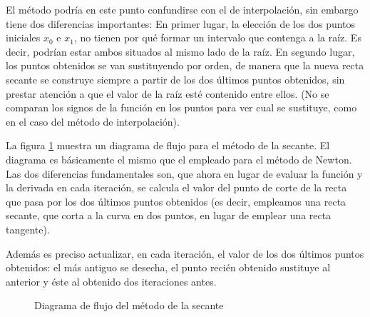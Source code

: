 El método podría en este punto confundirse con el de interpolación, sin embargo tiene dos diferencias importantes: En primer lugar, la elección de los dos puntos iniciales $x_0$ e $x_1$, no tienen por qué formar un intervalo que contenga a la raíz. Es decir, podrían estar ambos situados al mismo lado de la raíz. En segundo lugar, los puntos obtenidos se van sustituyendo por orden, de manera que la nueva recta secante se construye siempre a partir de los dos últimos puntos obtenidos, sin prestar atención a que el valor de la raíz esté contenido entre ellos. (No se comparan los signos de la función en los puntos para ver cual se sustituye, como en el caso del método de interpolación). 

La figura \ref{fig:secante2} muestra un diagrama de flujo para el método de la secante. El diagrama es básicamente el mismo que el empleado para el método de Newton. Las dos diferencias fundamentales son, que ahora en lugar de evaluar la función y la derivada en cada iteración, se calcula  el valor del punto de corte de la recta que pasa por los dos últimos puntos obtenidos (es decir, empleamos una recta secante, que corta a la curva en dos puntos, en lugar de emplear una recta tangente). 

Además es preciso actualizar, en cada iteración, el valor de los dos últimos puntos obtenidos: el más antiguo se desecha, el punto recién obtenido sustituye al anterior y éste al obtenido dos iteraciones antes. 

\begin{figure}[h]
\centering
{}
\caption{Diagrama de flujo del método de la secante}
\label{fig:secante2}
\end{figure}

